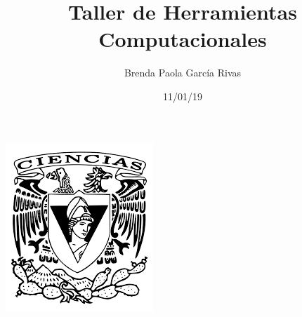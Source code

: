 \documentclass[letterpaper, 12pt, oneside]{article}%
\title{\Huge Taller de Herramientas Computacionales}
\author{Brenda Paola García Rivas}
\date{11/01/19}
\begin{document}
	\maketitle
	\begin{center}
		\includegraphics [scale=1.3]{1.png}
	\end{center}
	
\end{document}
